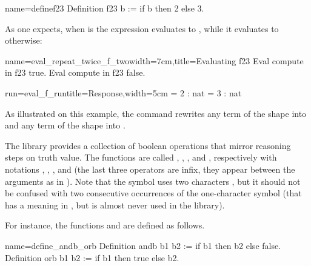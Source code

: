 \begin{coq}{name=definef23}{}
Definition f23 b := if b then 2 else 3.
\end{coq}

As one expects, when  is  the expression
 evaluates to , while it evaluates to  otherwise:

\begin{coq}{name=eval_repeat_twice_f_two}{width=7cm,title=Evaluating f23}
Eval compute in f23 true.
Eval compute in f23 false.
\end{coq}
\begin{coqout}{run=eval_f_run}{title=Response,width=5cm}
  = 2 : nat
  = 3 : nat
\end{coqout}

As illustrated on this example,
the  command rewrites any term of the shape
 into  and any term of the shape
 into .

The \mcbMC{} library provides a collection of boolean operations that
mirror reasoning steps on truth value.  The functions are called
, ,  , and , respectively with notations
\C{\~\~},  \C{||}, \C{&&}, and \C{==>} (the last three operators are
infix, they appear between the arguments as in ).
  Note that the symbol \C{\~\~} uses two characters \C{\~}, but it should
not be confused with two consecutive occurrences of the one-character symbol
\C{\~} (that has a meaning in \Coq{}, but is almost never used
in the \mcbMC{} library).

For instance, the functions  and  are defined as follows.

\begin{coq}{name=define_andb_orb}{}
Definition andb b1 b2 := if b1 then b2   else false.
Definition orb  b1 b2 := if b1 then true else b2.
\end{coq}


